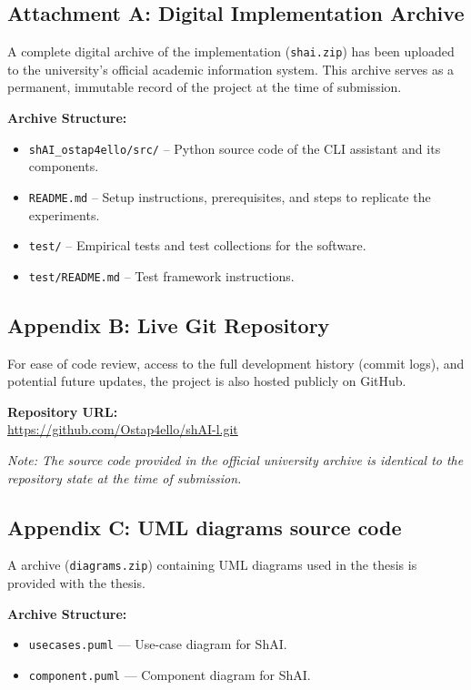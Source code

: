 \subsection*{Attachment A: Digital Implementation Archive}

A complete digital archive of the implementation (\texttt{shai.zip}) has been
uploaded to the university's official academic information system. This archive
serves as a permanent, immutable record of the project at the time of
submission.

\noindent \textbf{Archive Structure:}
\begin{itemize}
    \item \texttt{shAI\_ostap4ello/src/} -- Python source code of the CLI assistant and its components.
    \item \texttt{README.md} -- Setup instructions, prerequisites, and steps to replicate the experiments.
    \item \texttt{test/} -- Empirical tests and test collections for the software.
    \item \texttt{test/README.md} -- Test framework instructions.
\end{itemize}

\vspace{0.8cm}
\subsection*{Appendix B: Live Git Repository}

For ease of code review, access to the full development history (commit logs),
and potential future updates, the project is also hosted publicly on GitHub.

\vspace{0.3cm}
\noindent \textbf{Repository URL:} \\
\url{https://github.com/Ostap4ello/shAI-l.git}

\vspace{0.3cm}
\noindent \textit{Note: The source code provided in the official university
archive is identical to the repository state at the time of submission.}

\vspace{0.8cm}
\subsection*{Appendix C: UML diagrams source code}

A archive (\texttt{diagrams.zip}) containing UML diagrams used in the thesis is
provided with the thesis.

\noindent \textbf{Archive Structure:}
\begin{itemize}
    \item \texttt{usecases.puml} --- Use-case diagram for ShAI.
    \item \texttt{component.puml} --- Component diagram for ShAI.
\end{itemize}
